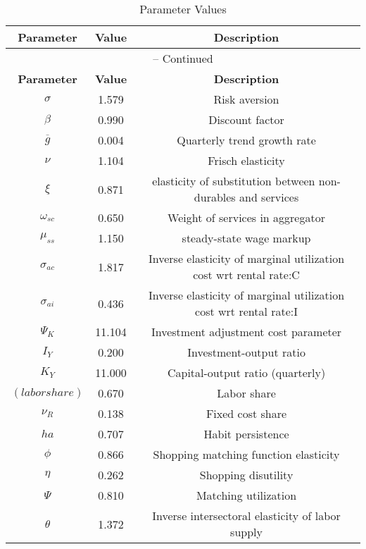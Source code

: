 \begin{center}
\begin{longtable}{ccc}
\caption{Parameter Values}\\%
\toprule%
\multicolumn{1}{c}{\textbf{Parameter}} &
\multicolumn{1}{c}{\textbf{Value}} &
 \multicolumn{1}{c}{\textbf{Description}}\\%
\midrule%
\endfirsthead
\multicolumn{3}{c}{{\tablename} \thetable{} -- Continued}\\%
\midrule%
\multicolumn{1}{c}{\textbf{Parameter}} &
\multicolumn{1}{c}{\textbf{Value}} &
  \multicolumn{1}{c}{\textbf{Description}}\\%
\midrule%
\endhead
${\sigma}$ 	 & 	 1.579 	 & 	 Risk aversion\\
${\beta}$ 	 & 	 0.990 	 & 	 Discount factor\\
${\overline{g}}$ 	 & 	 0.004 	 & 	 Quarterly trend growth rate\\
$\nu$ 	 & 	 1.104 	 & 	 Frisch elasticity\\
$\xi$ 	 & 	 0.871 	 & 	 elasticity of substitution between non-durables and services\\
$\omega_{sc}$ 	 & 	 0.650 	 & 	 Weight of services in aggregator\\
$\mu_{ss}$ 	 & 	 1.150 	 & 	 steady-state wage markup\\
${\sigma_{ac}}$ 	 & 	 1.817 	 & 	 Inverse elasticity of marginal utilization cost wrt rental rate:C\\
${\sigma_{ai}}$ 	 & 	 0.436 	 & 	 Inverse elasticity of marginal utilization cost wrt rental rate:I\\
${\Psi_{K}}$ 	 & 	 11.104 	 & 	 Investment adjustment cost parameter\\
${I_Y}$ 	 & 	 0.200 	 & 	 Investment-output ratio\\
${K_Y}$ 	 & 	 11.000 	 & 	 Capital-output ratio (quarterly)\\
$(labor share)$ 	 & 	 0.670 	 & 	 Labor share\\
${\nu_R}$ 	 & 	 0.138 	 & 	 Fixed cost share\\
${ha}$ 	 & 	 0.707 	 & 	 Habit persistence\\
${\phi}$ 	 & 	 0.866 	 & 	 Shopping matching function elasticity\\
${\eta}$ 	 & 	 0.262 	 & 	 Shopping disutility\\
${\Psi}$ 	 & 	 0.810 	 & 	 Matching utilization\\
${\theta}$ 	 & 	 1.372 	 & 	 Inverse intersectoral elasticity of labor supply\\

\end{longtable}
\end{center}
